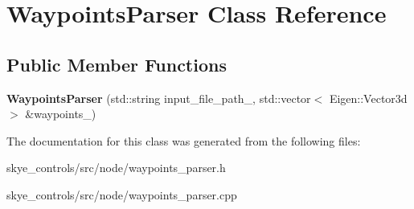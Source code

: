 \hypertarget{class_waypoints_parser}{\section{Waypoints\-Parser Class Reference}
\label{class_waypoints_parser}
}
\subsection*{Public Member Functions}
\begin{DoxyCompactItemize}
\item 
\hypertarget{class_waypoints_parser_a9092d254433ec849ab8d1e840ebf8946}{{\bfseries Waypoints\-Parser} (std\-::string input\-\_\-file\-\_\-path\-\_\-, std\-::vector$<$ Eigen\-::\-Vector3d $>$ \&waypoints\-\_\-)}\label{class_waypoints_parser_a9092d254433ec849ab8d1e840ebf8946}

\end{DoxyCompactItemize}


The documentation for this class was generated from the following files\-:\begin{DoxyCompactItemize}
\item 
skye\-\_\-controls/src/node/waypoints\-\_\-parser.\-h\item 
skye\-\_\-controls/src/node/waypoints\-\_\-parser.\-cpp\end{DoxyCompactItemize}

